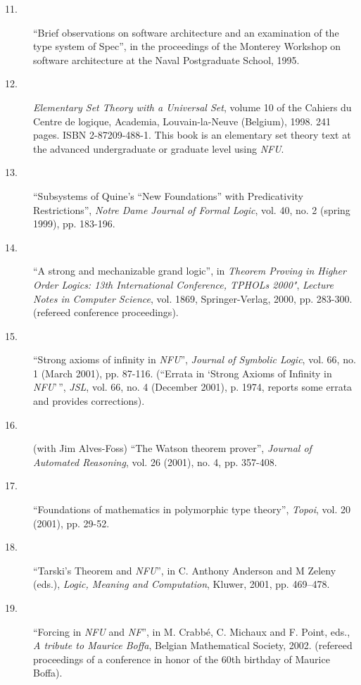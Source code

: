 \begin{description}
\begin{description}
\item[11.] ``Brief observations on software architecture and an
  examination of the type system of Spec'', in the proceedings of the
  Monterey Workshop on software architecture at the Naval Postgraduate
  School, 1995.

\item [12.]  {\em Elementary Set Theory with a
Universal Set\/}, volume 10 of the Cahiers du Centre de logique,
Academia, Louvain-la-Neuve (Belgium), 1998. 241 pages. ISBN
2-87209-488-1.  This book is an elementary set theory text at the
advanced undergraduate or graduate level using {\em NFU\/}.

\item[13.]  ``Subsystems of Quine's ``New Foundations'' with
Predicativity Restrictions'', {\em Notre Dame Journal of
Formal Logic\/}, vol. 40, no. 2 (spring 1999), pp. 183-196.

\item[14.]  ``A strong and mechanizable grand logic'', in {\em Theorem
Proving in Higher Order Logics: 13th International Conference, TPHOLs
2000"\/}, {\em Lecture Notes in Computer Science\/}, vol. 1869,
Springer-Verlag, 2000, pp. 283-300.  (refereed conference
proceedings).

\item[15.]  ``Strong axioms of infinity in {\em NFU\/}'', {\em Journal
of Symbolic Logic\/}, vol. 66, no. 1 (March 2001), pp. 87-116.  (``Errata in `Strong Axioms of Infinity in {\em NFU\/}'\,'', {\em JSL\/}, vol. 66, no. 4 (December 2001), p. 1974, reports some errata and provides corrections).

\item[16.]  (with Jim Alves-Foss) ``The Watson theorem prover'', {\em
Journal of Automated Reasoning\/}, vol. 26 (2001), no. 4, pp. 357-408.

\item[17.]  ``Foundations of mathematics in polymorphic type theory'',
{\em Topoi\/}, vol. 20 (2001), pp. 29-52.

\item[18.]  ``Tarski's Theorem and {\em NFU\/}'', in C. Anthony
Anderson and M Zeleny (eds.), {\em Logic, Meaning and Computation\/},
Kluwer, 2001, pp. 469--478.

\item[19.]  ``Forcing in {\em NFU\/} and {\em NF\/}'', in M. Crabb\'e,
C. Michaux and F. Point, eds., {\em A tribute to Maurice Boffa\/},
Belgian Mathematical Society, 2002.  (refereed proceedings of a
conference in honor of the 60th birthday of Maurice Boffa).


\end{description}
\end{description}
